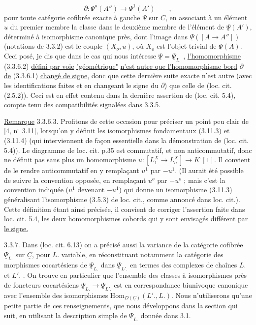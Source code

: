 \begin{equation}\tag{3.3.6.2}
 \partial : \Psi^{o}(A'') \longrightarrow \Psi^{1}(A') \qquad ,
\end{equation}
pour toute catégorie cofibrée exacte à gauche $\underline{\Psi}$ sur $\underline{C}$, en associant à un élément $u$ du premier membre la classe dans le deuxième membre de l'élément de $\underline{\Psi}(A')$, déterminé à isomorphisme canonique près, dont l'image dans $\underline{\Psi}([A \longrightarrow A''])$ (notations de 3.3.2) est le couple $(X_o,u)$, où $X_o$ est l'objet trivial de $\underline{\Psi}(A)$. Ceci posé, je dis que dans le cas qui nous intéresse $\underline{\Psi} = \underline{\Psi}_{L.}$ , \underline{l'homomorphisme} (3.3.6.2) \underline{défini par voie} \underline{"géométrique"} \underline{n'est autre que l'homomorphisme bord} $\partial$ \underline{de} (3.3.6.1) \underline{changé de signe}, donc que cette dernière suite exacte n'est autre (avec les identifications faites et en changeant le signe du $\partial$) que celle de (loc. cit. (2.5.2)). Ceci est en effet contenu dans la dernière assertion de (loc. cit. 5.4), compte tenu des compatibilités signalées dans 3.3.5.

\underline{Remarque} 3.3.6.3. Profitons de cette occasion pour préciser un point peu clair de [4, n$^{\circ}$ 3.11], lorsqu'on y définit les isomorphismes fondamentaux (3.11.3) et (3.11.4) (qui interviennent de façon essentielle dans la démonstration de (loc. cit. 5.4)). Le diagramme de loc. cit. p.35 est commutatif, et non anticommutatif, donc ne définit pas sans plus un homomorphisme $u : [L_1^X \longrightarrow L_o^X] \longrightarrow K^{\cdot}[1]$. Il convient de le rendre auticommutatif en y remplaçant $u^1$ par $-u^1$. (Il aurait été possible de suivre la convention opposée, en remplaçant $u^o$ par $-u^o$ ; mais c'est la convention indiquée ($u^1$ devenant $-u^1$) qui donne un isomorphisme (3.11.3) généralisant l'isomorphisme (3.5.3) de loc. cit., comme annoncé dans loc. cit.). Cette définition étant ainsi précisée, il convient de corriger l'assertion faite dans loc. cit. 5.4, les deux homomorphismes cobords qui
y sont envisagés \underline{différent par le signe.}

3.3.7. Dans (loc. cit. 6.13) on a précisé aussi la variance de la catégorie cofibrée $\underline{\Psi}_{L.}$ sur $\underline{C}$, pour $L.$ variable, en réconstituant notamment la catégorie des morphismes cocartésiens de $\underline{\Psi}_{L.}$ dans $\underline{\Psi}_{L'.}$ en termes des complexes de chaînes $L.$ et $L'.$ . On trouve en particulier que l'ensemble des classes à isomorphismes près de foncteurs cocartésiens $\underline{\Psi}_{L.} \longrightarrow \underline{\Psi}_{L'.}$ est en correspondance biunivoque canonique avec l'ensemble des isomorphismes $\mathrm{Hom}_{D(\underline{C})}(L'. ,L.)$. Nous n'utiliserons qu'une petite partie de ces renseignements, que nous développons dans la section qui suit, en utilisant la description simple de $\underline{\Psi}_{L.}$ donnée dans 3.1.


